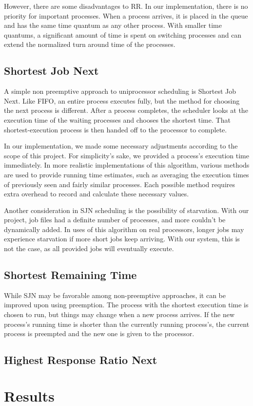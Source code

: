 \documentclass[conference,11pt]{IEEEtran}
\begin{document}
However, there are some disadvantages to RR. In our implementation, there is no priority for important processes. When a process arrives, it is placed in the queue and has the same time quantum as any other process. With smaller time quantums, a significant amount of time is spent on switching processes and can extend the normalized turn around time of the processes.

\subsection{Shortest Job Next}
A simple non preemptive approach to uniprocessor scheduling is Shortest Job Next. Like FIFO, an entire process executes fully, but the method for choosing the next process is different. After a process completes, the scheduler looks at the execution time of the waiting processes and chooses the shortest time. That shortest-execution process is then handed off to the processor to complete.

In our implementation, we made some necessary adjustments according to the scope of this project. For simplicity's sake, we provided a process's execution time immediately. In more realistic implementations of this algorithm, various methods are used to provide running time estimates, such as averaging the execution times of previously seen and fairly similar processes. Each possible method requires extra overhead to record and calculate these necessary values.

Another consideration in SJN scheduling is the possibility of starvation. With our project, job files had a definite number of processes, and more couldn't be dynamically added. In uses of this algorithm on real processors, longer jobs may experience starvation if more short jobs keep arriving. With our system, this is not the case, as all provided jobs will eventually execute.

\subsection{Shortest Remaining Time}
While SJN may be favorable among non-preemptive approaches, it can be improved upon using preemption. The process with the shortest execution time is chosen to run, but things may change when a new process arrives. If the new process's running time is shorter than the currently running process's, the current process is preempted and the new one is given to the processor.

\subsection{Highest Response Ratio Next}


\section{Results}
\end{document}
